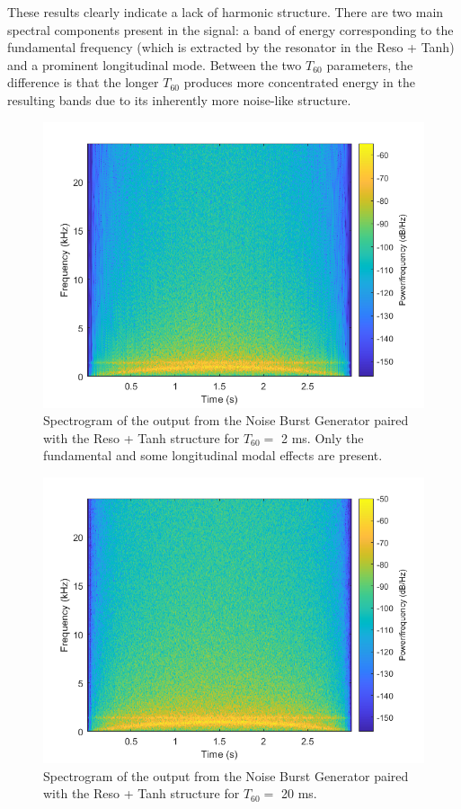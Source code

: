 \documentclass[../main.tex]{subfiles}
\begin{document}
These results clearly indicate a lack of harmonic structure. There are two main spectral components present in the signal: a band of energy corresponding to the fundamental frequency (which is extracted by the resonator in the Reso + Tanh) and a prominent longitudinal mode. Between the two $T_{60}$ parameters, the difference is that the longer $T_{60}$ produces more concentrated energy in the resulting bands due to its inherently more noise-like structure.

\clearpage

\begin{figure}[h!]
    \centering
    \includegraphics[scale=.60]{./images/plots/NBG-RT-T60-Short.png}
    \caption{Spectrogram of the output from the Noise Burst Generator paired with the Reso + Tanh structure for $T_{60} = $ 2 ms. Only the fundamental and some longitudinal modal effects are present.}
    \label{fig:NBG_RT_T60_Short}
\end{figure}

\begin{figure}[h!]
    \centering
    \includegraphics[scale=.60]{./images/plots/NBG-RT-T60-Long.png}
    \caption{Spectrogram of the output from the Noise Burst Generator paired with the Reso + Tanh structure for $T_{60} = $ 20 ms.}
    \label{fig:NBG_RT_T60_Long}
\end{figure}
\end{document}

